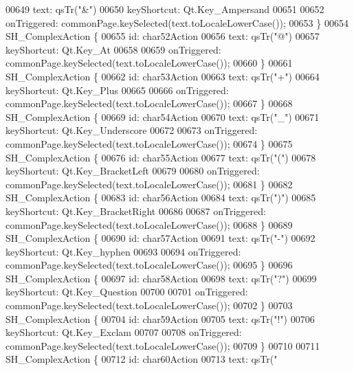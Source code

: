 \begin{DoxyCode}
00649         text: qsTr(\textcolor{stringliteral}{"&"})
00650         keyShortcut: Qt.Key\_Ampersand
00651 
00652         onTriggered: commonPage.keySelected(text.toLocaleLowerCase());
00653     \}
00654     SH\_ComplexAction \{
00655         \textcolor{keywordtype}{id}: char52Action
00656         text: qsTr(\textcolor{stringliteral}{"@"})
00657         keyShortcut: Qt.Key\_At
00658 
00659         onTriggered: commonPage.keySelected(text.toLocaleLowerCase());
00660     \}
00661     SH\_ComplexAction \{
00662         \textcolor{keywordtype}{id}: char53Action
00663         text: qsTr(\textcolor{stringliteral}{"+"})
00664         keyShortcut: Qt.Key\_Plus
00665 
00666         onTriggered: commonPage.keySelected(text.toLocaleLowerCase());
00667     \}
00668     SH\_ComplexAction \{
00669         \textcolor{keywordtype}{id}: char54Action
00670         text: qsTr(\textcolor{stringliteral}{"\_"})
00671         keyShortcut: Qt.Key\_Underscore
00672 
00673         onTriggered: commonPage.keySelected(text.toLocaleLowerCase());
00674     \}
00675     SH\_ComplexAction \{
00676         \textcolor{keywordtype}{id}: char55Action
00677         text: qsTr(\textcolor{stringliteral}{"("})
00678         keyShortcut: Qt.Key\_BracketLeft
00679 
00680         onTriggered: commonPage.keySelected(text.toLocaleLowerCase());
00681     \}
00682     SH\_ComplexAction \{
00683         \textcolor{keywordtype}{id}: char56Action
00684         text: qsTr(\textcolor{stringliteral}{")"})
00685         keyShortcut: Qt.Key\_BracketRight
00686 
00687         onTriggered: commonPage.keySelected(text.toLocaleLowerCase());
00688     \}
00689     SH\_ComplexAction \{
00690         \textcolor{keywordtype}{id}: char57Action
00691         text: qsTr(\textcolor{stringliteral}{"-"})
00692         keyShortcut: Qt.Key\_hyphen
00693 
00694         onTriggered: commonPage.keySelected(text.toLocaleLowerCase());
00695     \}
00696     SH\_ComplexAction \{
00697         \textcolor{keywordtype}{id}: char58Action
00698         text: qsTr(\textcolor{stringliteral}{"?"})
00699         keyShortcut: Qt.Key\_Question
00700 
00701         onTriggered: commonPage.keySelected(text.toLocaleLowerCase());
00702     \}
00703     SH\_ComplexAction \{
00704         \textcolor{keywordtype}{id}: char59Action
00705         text: qsTr(\textcolor{stringliteral}{"!"})
00706         keyShortcut: Qt.Key\_Exclam
00707 
00708         onTriggered: commonPage.keySelected(text.toLocaleLowerCase());
00709     \}
00710 
00711     SH\_ComplexAction \{
00712         \textcolor{keywordtype}{id}: char60Action
00713         text: qsTr(\textcolor{stringliteral}{"%
}
\end{DoxyCode}
